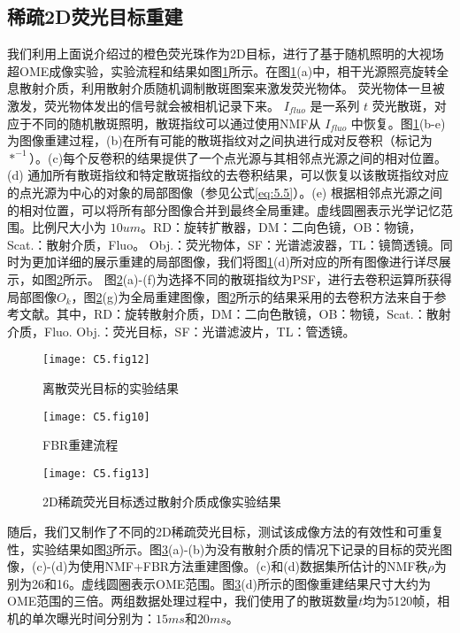 \subsection{稀疏2D荧光目标重建}
我们利用上面说介绍过的橙色荧光珠作为2D目标，进行了基于随机照明的大视场超OME成像实验，实验流程和结果如图\ref{fig:5.12}所示。在图\ref{fig:5.12}(a)中，相干光源照亮旋转全息散射介质，利用散射介质随机调制散斑图案来激发荧光物体。 荧光物体一旦被激发，荧光物体发出的信号就会被相机记录下来。 $I_{fluo}$ 是一系列 $t$ 荧光散斑，对应于不同的随机散斑照明，散斑指纹可以通过使用NMF从 $I_{fluo}$ 中恢复。图\ref{fig:5.12}(b-e)为图像重建过程，(b)在所有可能的散斑指纹对之间执进行成对反卷积（标记为 $*^{-1}$）。(c)每个反卷积的结果提供了一个点光源与其相邻点光源之间的相对位置。(d) 通加所有散斑指纹和特定散斑指纹的去卷积结果，可以恢复以该散斑指纹对应的点光源为中心的对象的局部图像（参见公式\ref{eq:5.5}）。(e) 根据相邻点光源之间的相对位置，可以将所有部分图像合并到最终全局重建。虚线圆圈表示光学记忆范围。比例尺大小为 $10 um$。RD：旋转扩散器，DM：二向色镜，OB：物镜，Scat.：散射介质，Fluo。 Obj.：荧光物体，SF：光谱滤波器，TL：镜筒透镜。同时为更加详细的展示重建的局部图像，我们将图\ref{fig:5.12}(d)所对应的所有图像进行详尽展示，如图\ref{fig:5.10}所示。
图\ref{fig:5.10}(a)-(f)为选择不同的散斑指纹为PSF，进行去卷积运算所获得局部图像$O_{k}$，图\ref{fig:5.10}(g)为全局重建图像，图\ref{fig:5.10}所示的结果采用的去卷积方法来自于参考文献\cite{Chan2011}。其中，RD：旋转散射介质，DM：二向色散镜，OB：物镜，Scat.：散射介质，Fluo. Obj.：荧光目标，SF：光谱滤波片，TL：管透镜。

\begin{figure}[htp]
	\centering
	\texttt{[image: C5.fig12]}
	\caption{离散荧光目标的实验结果}
	\label{fig:5.12}
\end{figure}

\begin{figure}[htp]
	\centering
	\texttt{[image: C5.fig10]}
	\caption{FBR重建流程}
	\label{fig:5.10}
\end{figure}

\begin{figure}[htp]
	\centering
	\texttt{[image: C5.fig13]}
	\caption{2D稀疏荧光目标透过散射介质成像实验结果}
	\label{fig:5.13}
\end{figure}

随后，我们又制作了不同的2D稀疏荧光目标，测试该成像方法的有效性和可重复性，实验结果如图\ref{fig:5.13}所示。图\ref{fig:5.13}(a)-(b)为没有散射介质的情况下记录的目标的荧光图像，(c)-(d)为使用NMF+FBR方法重建图像。(c)和(d)数据集所估计的NMF秩$\rho$为别为26和16。虚线圆圈表示OME范围。图\ref{fig:5.13}(d)所示的图像重建结果尺寸大约为OME范围的三倍。两组数据处理过程中，我们使用了的散斑数量$t$均为5120帧，相机的单次曝光时间分别为：$15ms$和$20 ms$。

